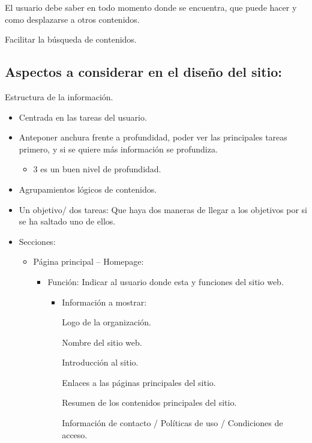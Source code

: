 \documentclass[12pt, twoside, openright]{report} %
\begin{document}
El usuario debe saber en todo momento donde se encuentra, que
puede hacer y como desplazarse a otros contenidos.

Facilitar la búsqueda de contenidos.


\subsection{Aspectos a considerar en el diseño del sitio:}

Estructura de la información.

\begin{itemize}
	\item Centrada en las tareas del usuario.
	\item Anteponer anchura frente a profundidad, poder ver las
	      principales tareas primero, y si se quiere más información se
	      profundiza.
	      \begin{itemize}
		      \item 3 es un buen nivel de profundidad.
	      \end{itemize}
	\item Agrupamientos lógicos de contenidos.
	\item Un objetivo/ dos tareas: Que haya dos maneras de llegar a los
	      objetivos por si se ha saltado uno de ellos.
	      \pagebreak

	\item Secciones:
	      \begin{itemize}
		      \item Página principal -- Homepage:
		            \begin{itemize}
			            \item Función: Indicar al usuario donde esta y funciones del sitio
			                  web.
			                  \begin{itemize}
				                  \item Información a mostrar:

				                        Logo de la organización.

				                        Nombre del sitio web.

				                        Introducción al sitio.

				                        Enlaces a las páginas principales del sitio.

				                        Resumen de los contenidos principales del sitio.

				                        Información de contacto / Políticas de uso / Condiciones
				                        de acceso.


\end{itemize}
\end{itemize}
\end{itemize}
\end{itemize}
\end{document}
